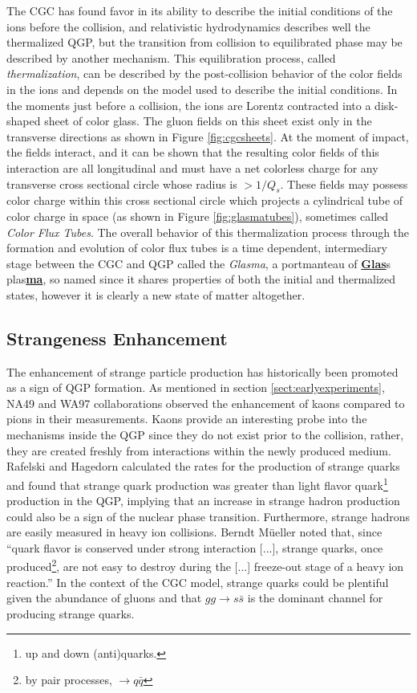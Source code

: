 The CGC has found favor in its ability to describe the initial conditions of the ions before the collision, and relativistic hydrodynamics describes well the thermalized QGP, but the transition from collision to equilibrated phase may be described by another mechanism. This equilibration process, called \textit{thermalization}, can be described by the post-collision behavior of the color fields in the ions \citep{Fujii:2008dd} and depends on the model used to describe the initial conditions. In the moments just before a collision, the ions are Lorentz contracted into a disk-shaped sheet of color glass. The gluon fields on this sheet exist only in the transverse directions as shown in Figure \ref{fig:cgcsheets}. At the moment of impact, the fields interact, and it can be shown \citep{Fries:2006pv} that the resulting color fields of this interaction are all longitudinal and must have a net colorless charge for any transverse cross sectional circle whose radius is $> 1/Q_s$. These fields may possess color charge within this cross sectional circle which projects a cylindrical tube of color charge in space (as shown in Figure \ref{fig:glasmatubes}), sometimes called \textit{Color Flux Tubes}. The overall behavior of this thermalization process through the formation and evolution of color flux tubes is a time dependent, intermediary stage between the CGC and QGP called the \textit{Glasma}, a portmanteau of \underline{\textbf{Glas}}s plas\underline{\textbf{ma}}, so named since it shares properties of both the initial and thermalized states, however it is clearly a new state of matter altogether.

\subsection{Strangeness Enhancement}
The enhancement of strange particle production has historically been promoted as a sign of QGP formation. As mentioned in section \ref{sect:earlyexperiments}, NA49 and WA97 collaborations observed the enhancement of kaons compared to pions in their measurements. Kaons provide an interesting probe into the mechanisms inside the QGP since they do not exist prior to the collision, rather, they are created freshly from interactions within the newly produced medium. Rafelski and Hagedorn calculated the rates for the production of strange quarks\citep{statmechofquarks} and found that strange quark production was greater than light flavor quark\footnote{up and down (anti)quarks.} production in the QGP, implying that an increase in strange hadron production could also be a sign of the nuclear phase transition. Furthermore, strange hadrons are easily measured in heavy ion collisions. Berndt M\"ueller noted that, since ``quark flavor is conserved under strong interaction [...], strange quarks, once produced\footnote{by pair processes, $\rightarrow q\bar{q}$}, are not easy to destroy during the [...] freeze-out stage of a heavy ion reaction.''\citep{Muller:2011tu} In the context of the CGC model, strange quarks could be plentiful given the abundance of gluons and that $gg \rightarrow s \bar{s}$ is the dominant channel for producing strange quarks\citep{PhysRevLett.48.1066}.

